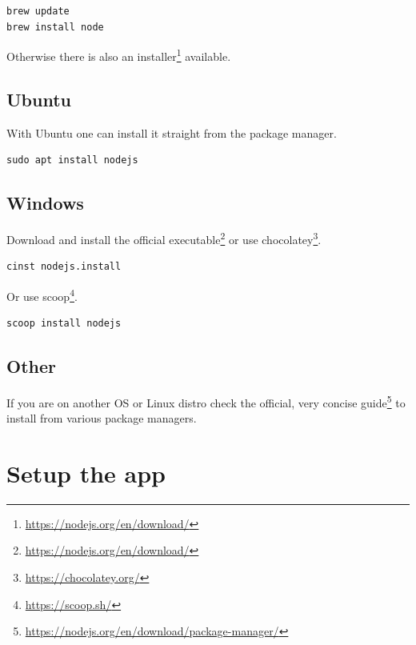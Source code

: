 \documentclass[10pt,]{krantz}
\renewcommand{\href}[2]{#2\footnote{\url{#1}}}
\begin{document}
\begin{verbatim}
brew update
brew install node
\end{verbatim}

Otherwise there is also an \href{https://nodejs.org/en/download/}{installer} available.

\hypertarget{webpack-intro-install-ubuntu}{%
\subsection{Ubuntu}\label{webpack-intro-install-ubuntu}}

With Ubuntu one can install it straight from the package manager.

\begin{verbatim}
sudo apt install nodejs
\end{verbatim}

\hypertarget{webpack-intro-install-windows}{%
\subsection{Windows}\label{webpack-intro-install-windows}}

Download and install the official \href{https://nodejs.org/en/download/}{executable} or use \href{https://chocolatey.org/}{chocolatey}.

\begin{verbatim}
cinst nodejs.install
\end{verbatim}

Or use \href{https://scoop.sh/}{scoop}.

\begin{verbatim}
scoop install nodejs
\end{verbatim}

\hypertarget{webpack-intro-install-other}{%
\subsection{Other}\label{webpack-intro-install-other}}

If you are on another OS or Linux distro check the official, very concise \href{https://nodejs.org/en/download/package-manager/}{guide} to install from various package managers.

\hypertarget{webpack-intro-setup}{%
\section{Setup the app}\label{webpack-intro-setup}}
\end{document}
